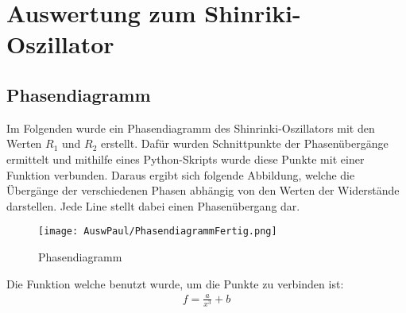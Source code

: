 \section{Auswertung zum Shinriki-Oszillator}

\subsection{Phasendiagramm}
Im Folgenden wurde ein Phasendiagramm des Shinrinki-Oszillators mit den Werten \(R_1\) und \(R_2\) erstellt. Dafür wurden Schnittpunkte der Phasenübergänge ermittelt und mithilfe eines Python-Skripts wurde diese Punkte mit einer Funktion verbunden. Daraus ergibt sich folgende Abbildung, welche die Übergänge der verschiedenen Phasen abhängig von den Werten der Widerstände darstellen. Jede Line stellt dabei einen Phasenübergang dar.

\begin{figure}[h]
    \centering
    \texttt{[image: AuswPaul/PhasendiagrammFertig.png]}
    \label{fig:Phasendiagramm}
    \caption{Phasendiagramm}
\end{figure}

Die Funktion welche benutzt wurde, um die Punkte zu verbinden ist:
\begin{align}
    f = \frac{a}{x^3} +b
\end{align}

